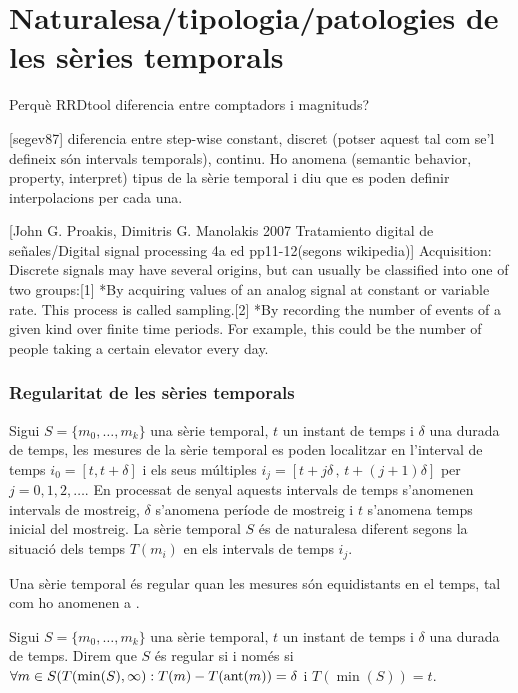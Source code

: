 \section{Naturalesa/tipologia/patologies de les sèries temporals}


Perquè RRDtool diferencia entre comptadors i magnituds?

[segev87] diferencia entre step-wise constant, discret (potser aquest tal com se'l defineix són intervals temporals), continu. Ho anomena (semantic behavior, property, interpret)
 tipus de la sèrie temporal i diu que es poden definir interpolacions per cada una.




[John G. Proakis, Dimitris G. Manolakis 2007 Tratamiento digital de señales/Digital signal processing 4a ed pp11-12(segons wikipedia)] Acquisition: Discrete signals may have several origins, but can usually be classified into one of two groups:[1]
*By acquiring values of an analog signal at constant or variable rate. This process is called sampling.[2]
*By recording the number of events of a given kind over finite time periods. For example, this could be the number of people taking a certain elevator every day.



\subsubsection{Regularitat de les sèries temporals} 

Sigui $S=\{m_0,\ldots,m_k\}$ una sèrie temporal, $t$ un instant de
temps i $\delta$ una durada de temps, les mesures de la sèrie temporal
es poden localitzar en l'interval de temps $i_0=[t,t+\delta]$ i els
seus múltiples $i_j=[t+j\delta \,,\, t+(j+1)\delta]$ per $j=0,1,2,\ldots$.
En processat de senyal aquests intervals de temps s'anomenen intervals
de mostreig, $\delta$ s'anomena període de mostreig i $t$ s'anomena
temps inicial del mostreig.  La sèrie temporal $S$ és de naturalesa
diferent segons la situació dels temps $T(m_i)$ en els intervals de
temps $i_j$.

Una sèrie temporal és regular quan les mesures són equidistants en el
temps, tal com ho anomenen a \cite{last:hetland}.

\begin{definition}
  \label{def:st:regular}
  Sigui $S=\{m_0,\ldots,m_k\}$ una sèrie temporal, $t$ un instant de
  temps i $\delta$ una durada de temps. Direm que $S$ és regular si i
  només si $\forall m \in S(T(\min(S),\infty):T(m) - T(\operatorname*{ant}(m)) =
  \delta$ i $T(\min(S))=t$.
\end{definition}

